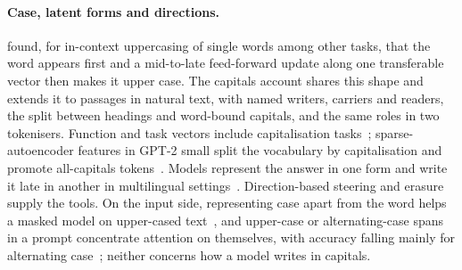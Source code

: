 \documentclass[11pt]{article}
\begin{document}
\paragraph{Case, latent forms and directions.} \citet{merullo2024word2vec} found, for in-context uppercasing of single words among other tasks, that the word appears first and a mid-to-late feed-forward update along one transferable vector then makes it upper case. The capitals account shares this shape and extends it to passages in natural text, with named writers, carriers and readers, the split between headings and word-bound capitals, and the same roles in two tokenisers. Function and task vectors include capitalisation tasks~\citep{todd2024function,hendel2023taskvectors}; sparse-autoencoder features in GPT-2 small split the vocabulary by capitalisation and promote all-capitals tokens~\citep{bloom2024saelogitlens}. Models represent the answer in one form and write it late in another in multilingual settings~\citep{wendler2024llamas,saji2025romanlens}. Direction-based steering and erasure~\citep{turner2023steering,panickssery2023caa,marks2023geometry,park2023linear,belrose2023leace} supply the tools. On the input side, representing case apart from the word helps a masked model on upper-cased text~\citep{powalski2020unicase}, and upper-case or alternating-case spans in a prompt concentrate attention on themselves, with accuracy falling mainly for alternating case~\citep{dillitzer2026casing}; neither concerns how a model writes in capitals.
\end{document}
